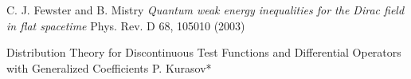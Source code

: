 \documentclass[11pt, oneside]{report}   	%
\theoremstyle{remark}
\begin{document}
C. J. Fewster and B. Mistry \textit{Quantum weak energy inequalities for the Dirac field in flat spacetime}
Phys. Rev. D 68, 105010 (2003) 

Distribution Theory for Discontinuous Test Functions and Differential Operators with Generalized Coefficients
P. Kurasov*
\end{document}
